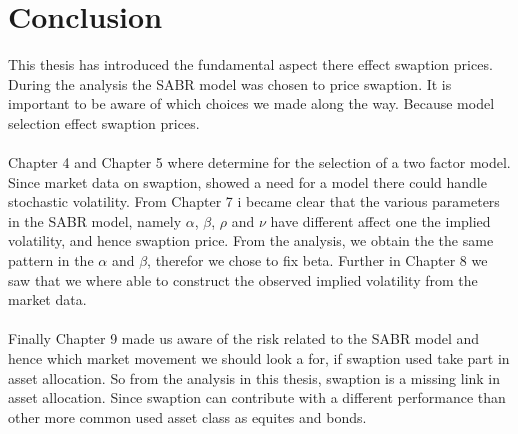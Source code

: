 \section{Conclusion}
This thesis has introduced the fundamental 
aspect there effect swaption prices. 
During the analysis the SABR model was chosen
to price swaption. It is important to be aware
of which choices we made along the way. 
Because model selection effect swaption prices. 
\\\\
Chapter 4 and Chapter 5 where determine for 
the selection of a two factor model. 
Since market data on swaption, showed a need
for a model there could handle stochastic 
volatility. From Chapter 7 i became clear 
that the various parameters in the SABR model, 
namely $\alpha$, $\beta$, $\rho$ and $\nu$ 
have different affect one the implied volatility,
and hence swaption price. 
From the analysis, we obtain the the same pattern in 
the $\alpha$ and $\beta$, therefor we chose 
to fix beta. Further in Chapter 8 we saw that we
where able to construct the observed implied volatility
from the market data. 
\\\\
Finally Chapter 9 made us aware
of the risk related to the SABR model and hence which market 
movement we should look a for, if swaption used take part 
in asset allocation.  So from the analysis 
in this thesis, swaption is a missing link in asset 
allocation. Since swaption can contribute with 
a different performance than other more common used asset 
class as equites and bonds.
